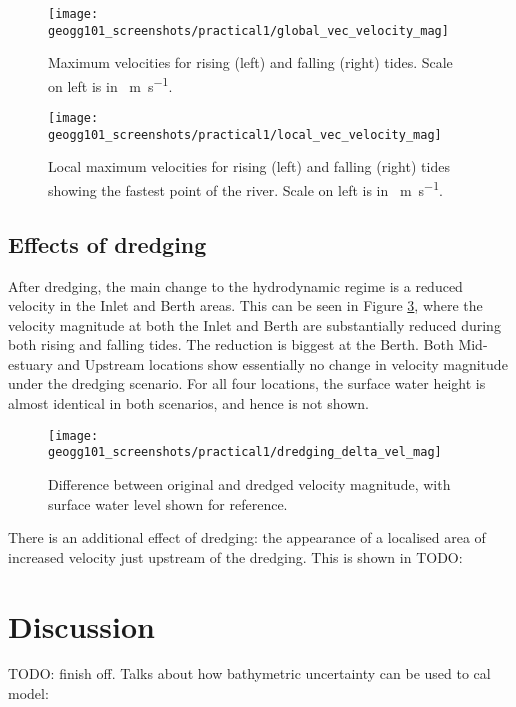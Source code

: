 \documentclass{article}
\begin{document}
\begin{figure}[!h]
    \centering
    \texttt{[image: geogg101\_screenshots/practical1/global\_vec\_velocity\_mag]}
    \caption{Maximum velocities for rising (left) and falling (right) tides. Scale on left is in \SI{}{m.s^{-1}}.}
    \label{fig:global_velocities}
\end{figure}

\begin{figure}[!h]
    \centering
    \texttt{[image: geogg101\_screenshots/practical1/local\_vec\_velocity\_mag]}
    \caption{Local maximum velocities for rising (left) and falling (right) tides showing the fastest point of the river. Scale on left is in \SI{}{m.s^{-1}}.}
    \label{fig:local_velocities}
\end{figure}

\subsection{Effects of dredging}

After dredging, the main change to the hydrodynamic regime is a reduced velocity in the Inlet and Berth areas. This can be seen in Figure \ref{fig:dredging_delta_vel_mag}, where the velocity magnitude at both the Inlet and Berth are substantially reduced during both rising and falling tides. The reduction is biggest at the Berth. Both Mid-estuary and Upstream locations show essentially no change in velocity magnitude under the dredging scenario. For all four locations, the surface water height is almost identical in both scenarios, and hence is not shown.

\begin{figure}[!h]
    \centering
    \texttt{[image: geogg101\_screenshots/practical1/dredging\_delta\_vel\_mag]}
    \caption{Difference between original and dredged velocity magnitude, with surface water level shown for reference.}
    \label{fig:dredging_delta_vel_mag}
\end{figure}

There is an additional effect of dredging: the appearance of a localised area of increased velocity just upstream of the dredging. This is shown in TODO: %

\section{Discussion}

TODO: finish off. Talks about how bathymetric uncertainty can be used to cal model: \textcite{cea2012bathymetric}
\end{document}

